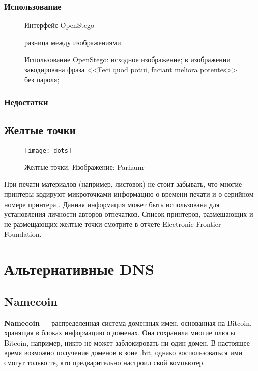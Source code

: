 \subsubsection{Использование}
\begin{figure}[h]
\caption{Интерфейс OpenStego}
\end{figure}
\begin{figure}[ht!]
\vspace{-4ex}
\centering
{}
\hspace{4ex}
\hspace{4ex}
\caption{Использование OpenStego:
 исходное изображение;
 в изображении закодирована фраза <<Feci quod potui, faciant meliora potentes>> без пароля;
} разница между изображениями.
\end{figure}
\subsubsection{Недостатки}
\subsection{Желтые точки}
\begin{wrapfigure}[9]{r}{0.25\linewidth}
\texttt{[image: dots]}
\caption{Желтые точки. Изображение: Parhamr}
\end{wrapfigure}
При печати материалов (например, листовок) не стоит забывать, что многие принтеры кодируют микроточками информацию о времени печати и о серийном номере принтера \cite{eff_dots}. Данная информация может быть использована для установления личности авторов отпечатков. Список принтеров, размещающих и не размещающих желтые точки смотрите в отчете Electronic Frontier Foundation\cite{eff_list}.

\section{Альтернативные DNS}
\subsection{Namecoin}
\textbf{Namecoin} --- распределенная система доменных имен, основанная на Bitcoin, хранящая в блоках информацию о доменах. Она сохранила многие плюсы Bitcoin, например, никто не может заблокировать ни один домен. В настоящее время возможно получение доменов в зоне .bit, однако воспользоваться ими смогут только те, кто предварительно настроил свой компьютер.
